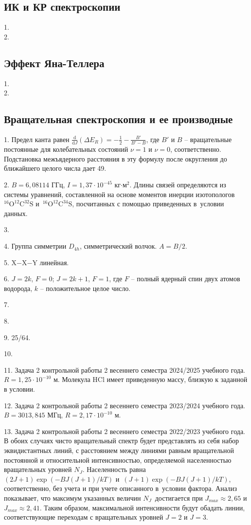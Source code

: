 \subsection{ИК и КР спектроскопии}
1. \\
2. 
\newpage

\subsection{Эффект Яна-Теллера}
1. \\
2. 
\newpage

\subsection{Вращательная спектроскопия и ее производные}
1. Предел канта равен $\frac{\text{d}}{\text{d}J}( \Delta E_R) = -\frac{1}{2}-\frac{B'}{B'-B}$, где $B'$ и $B$ – вращательные постоянные для колебательных состояний $\nu=1$ и $\nu=0$, соответственно. Подстановка межъядерного расстояния в эту формулу после округления до ближайшего целого числа дает 49.\par
2. $B=6,08114$ ГГц, $I=1,37\cdot10^{-45}$ кг$\cdot$м$^2$. Длины связей определяются из системы уравнений, составленной на основе моментов инерции изотопологов $^{16}\text{O}^{12}\text{C}^{32}\text{S}$ и~$^{16}\text{O}^{12}\text{C}^{34}\text{S}$, посчитанных с помощью приведенных в~условии данных.\par
3. \par
4. Группа симметрии $D_{4h}$, симметрический волчок. $A=B/2$.\par
5. X$-$X$-$Y линейная.\par
6. $J=2k$, $F=0$; $J=2k+1$, $F=1$, где $F$ – полный ядерный спин двух атомов водорода, $k$ – положительное целое число.\par
7. \par
8. \par
9. 25/64.\par
10. \par
11. Задача 2 контрольной работы 2 весеннего семестра 2024/2025 учебного года. $R=1,25\cdot10^{-10}$ м. Молекула HCl имеет приведенную массу, близкую к заданной в условии. \par
12. Задача 2 контрольной работы 2 весеннего семестра 2023/2024 учебного года. $B=3013,845$ МГц, $R=2,17\cdot10^{-10}$ м.\par
13. Задача 2 контрольной работы 2 весеннего семестра 2022/2023 учебного года. В обоих случаях чисто вращательный спектр будет представлять из себя набор эквидистантных линий, с расстоянием между линиями равным вращательной постоянной и относительной интенсивностью, определяемой населенностью вращательных уровней $N_J$. Населенность равна $(2J+1)\exp(-BJ(J+1)/kT)$ и~$(J+1)\exp(-BJ(J+1)/kT)$, соответственно, без учета и при учете описанного в~условии фактора. Анализ показывает, что максимум указанных величин $N_J$~достигается при $J_{max}\approx 2,65$ и $J_{max}\approx 2,41$. Таким образом, максимальной интенсивности будут обадать линии, соответствующие переходам с вращательных уровней $J=2$ и $J=3$.\par
\newpage

